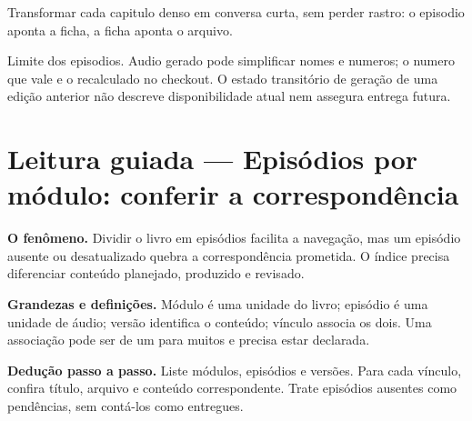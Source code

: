 \begin{funcao}
Transformar cada capitulo denso em conversa curta, sem perder rastro: o episodio aponta a ficha, a ficha aponta o arquivo.
\end{funcao}

\begin{aviso}
Limite dos episodios. Audio gerado pode simplificar nomes e numeros; o numero que vale e o recalculado no checkout. O estado transitório de geração de uma edição anterior não descreve disponibilidade atual nem assegura entrega futura.
\end{aviso}


\section[Leitura guiada]{Leitura guiada — Episódios por módulo: conferir a correspondência}
\begin{descricao}
\textbf{O fenômeno.} Dividir o livro em episódios facilita a navegação, mas um episódio ausente ou desatualizado quebra a correspondência prometida. O índice precisa diferenciar conteúdo planejado, produzido e revisado.
\end{descricao}

\begin{definicao}
\textbf{Grandezas e definições.} Módulo é uma unidade do livro; episódio é uma unidade de áudio; versão identifica o conteúdo; vínculo associa os dois. Uma associação pode ser de um para muitos e precisa estar declarada.
\end{definicao}

\begin{metodo}
\textbf{Dedução passo a passo.} Liste módulos, episódios e versões. Para cada vínculo, confira título, arquivo e conteúdo correspondente. Trate episódios ausentes como pendências, sem contá-los como entregues.
\end{metodo}


